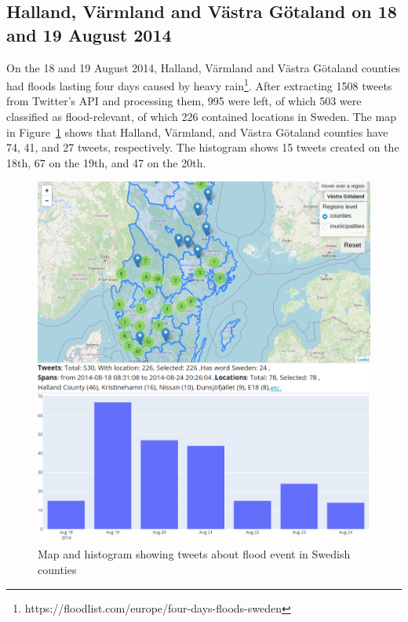 \subsection{Halland, Värmland and Västra Götaland on 18 and 19 August 2014}

On the 18 and 19 August 2014, Halland, Värmland and Västra Götaland counties had floods lasting four
days caused by heavy rain\footnote{https://floodlist.com/europe/four-days-floods-sweden}. After
extracting 1508 tweets from Twitter's API and processing them, 995 were left, of which 503 were
classified as flood-relevant, of which 226 contained locations in Sweden. The map in
Figure~\ref{fig:4days_floods} shows that Halland, Värmland, and Västra Götaland counties have 74,
41, and 27 tweets, respectively. The histogram shows 15 tweets created on the 18th, 67 on the 19th,
and 47 on the 20th.

\begin{figure}[H]
  \begin{center}
    \includegraphics[width=13cm]{./images/4days_floods.png}
  \end{center}
  \caption{Map and histogram showing tweets about flood event in Swedish counties}
  \label{fig:4days_floods}
\end{figure}

